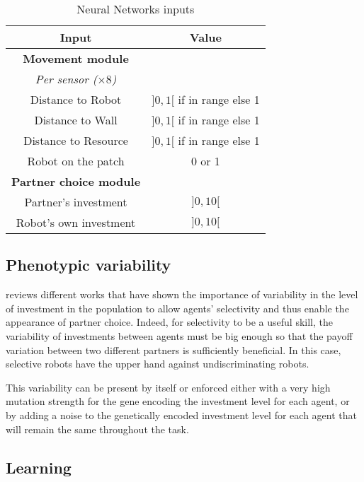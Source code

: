 \begin{table}
    \centering
    \begin{tabular}{cc}
        \hline
        \textbf{Input} & \textbf{Value}  \\
        \hline
        \textbf{Movement module} & \\
        \textit{Per sensor ($\times 8$)}& \\
        Distance to Robot &  $]0, 1[$ if in range else 1 \\
        Distance to Wall & $]0, 1[$ if in range else 1  \\
        Distance to Resource & $]0, 1[$ if in range else 1  \\
        Robot on the patch & 0 or 1 \\
        \hline
        \textbf{Partner choice module} & \\
        Partner's investment & $]0, 10[$ \\
        Robot's own investment & $]0, 10[$ \\
        \hline
    \end{tabular}
    \caption{Neural Networks inputs}
    \label{tab:ann_params}
\end{table}

\subsection{Phenotypic variability} \label{sec:phenovar}

\citet{McNamara2010c} reviews different works that have shown the importance of variability in the level of investment in the population to allow agents' selectivity and thus enable the appearance of partner choice. Indeed, for selectivity to be a useful skill, the variability of investments between agents must be big enough so that the payoff variation between two different partners is sufficiently beneficial. In this case, selective robots have the upper hand against undiscriminating robots.

This variability can be present by itself or enforced either with a very high mutation strength for the gene encoding the investment level for each agent, or by adding a noise to the genetically encoded investment level for each agent that will remain the same throughout the task. 

\subsection{Learning}

